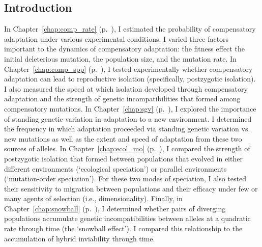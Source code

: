 \begin{doublespace}

\chapter*{Introduction}


In Chapter~\ref{chap:comp_rate} (p.~\pageref{chap:comp_rate}),
I estimated the probability of compensatory adaptation
under various experimental conditions.
%
I varied three factors important to the dynamics of compensatory adaptation:
the fitness effect the initial deleterious mutation,
the population size, and the mutation rate.
%
In Chapter~\ref{chap:comp_spp} (p.~\pageref{chap:comp_spp}),
I tested experimentally whether compensatory adaptation
can lead to reproductive isolation (specifically, postzygotic isolation).
%
I also measured the speed at which isolation developed
through compensatory adaptation and the strength of genetic incompatibilities
that formed among compensatory mutations.
%
In Chapter~\ref{chap:sgv} (p.~\pageref{chap:sgv}),
I explored the importance of standing genetic variation
in adaptation to a new environment.
%
I determined the frequency in which adaptation
proceeded via standing genetic variation vs. new mutations
as well as the extent and speed of adaptation
from these two sources of alleles.
%
In Chapter~\ref{chap:ecol_mo} (p.~\pageref{chap:ecol_mo}),
I compared the strength of postzygotic isolation that formed
between populations that evolved in either different environments
(`ecological speciation') or parallel environments
(`mutation-order speciation').
%
For these two modes of speciation,
I also tested their sensitivity to migration between populations
and their efficacy under few or many agents of selection (i.e., dimensionality).
%
Finally, in Chapter~\ref{chap:snowball} (p.~\pageref{chap:snowball}),
I determined whether pairs of diverging populations accumulate
genetic incompatibilities between alleles at a quadratic rate through time
(the `snowball effect').
%
I compared this relationship to the accumulation of hybrid inviability
through time.

\end{doublespace}
